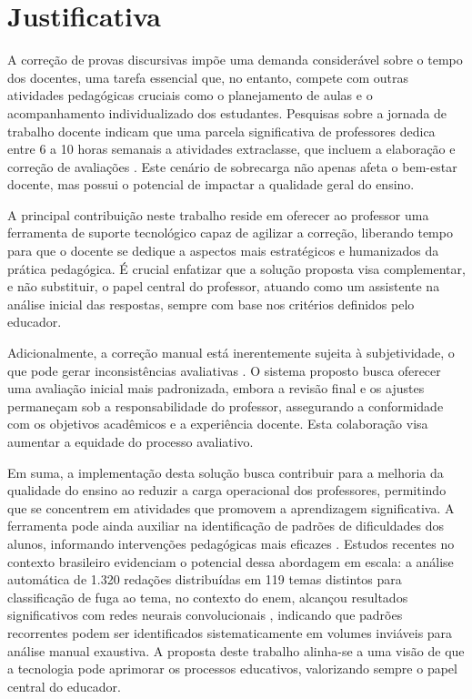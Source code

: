 \section{Justificativa}

A correção de provas discursivas impõe uma demanda considerável sobre o tempo dos docentes, uma tarefa essencial que, no entanto, compete com outras atividades pedagógicas cruciais como o planejamento de aulas e o acompanhamento individualizado dos estudantes. Pesquisas sobre a jornada de trabalho docente indicam que uma parcela significativa de professores dedica entre 6 a 10 horas semanais a atividades extraclasse, que incluem a elaboração e correção de avaliações \cite{barbosa_tempo_2021}. Este cenário de sobrecarga não apenas afeta o bem-estar docente, mas possui o potencial de impactar a qualidade geral do ensino.

A principal contribuição neste trabalho reside em oferecer ao professor uma ferramenta de suporte tecnológico capaz de agilizar a correção, liberando tempo para que o docente se dedique a aspectos mais estratégicos e humanizados da prática pedagógica. É crucial enfatizar que a solução proposta visa complementar, e não substituir, o papel central do professor, atuando como um assistente na análise inicial das respostas, sempre com base nos critérios definidos pelo educador.

Adicionalmente, a correção manual está inerentemente sujeita à subjetividade, o que pode gerar inconsistências avaliativas \cite{borges_avaliacao_2017}. O sistema proposto busca oferecer uma avaliação inicial mais padronizada, embora a revisão final e os ajustes permaneçam sob a responsabilidade do professor, assegurando a conformidade com os objetivos acadêmicos e a experiência docente. Esta colaboração visa aumentar a equidade do processo avaliativo.

Em suma, a implementação desta solução busca contribuir para a melhoria da qualidade do ensino ao reduzir a carga operacional dos professores, permitindo que se concentrem em atividades que promovem a aprendizagem significativa. A ferramenta pode ainda auxiliar na identificação de padrões de dificuldades dos alunos, informando intervenções pedagógicas mais eficazes \cite{santos_articulacao_2016}. Estudos recentes no contexto brasileiro evidenciam o potencial dessa abordagem em escala: a análise automática de 1.320 redações distribuídas em 119 temas distintos para classificação de fuga ao tema, no contexto do \gls{enem}, alcançou resultados significativos com redes neurais convolucionais \cite{pinho_aplicacao_2024}, indicando que padrões recorrentes podem ser identificados sistematicamente em volumes inviáveis para análise manual exaustiva. A proposta deste trabalho alinha-se a uma visão de que a tecnologia pode aprimorar os processos educativos, valorizando sempre o papel central do educador.


